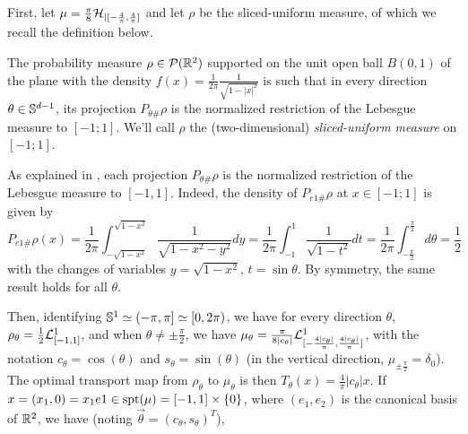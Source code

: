 First, let $\mu = \frac{\pi}{8} \mathcal{H}_{|[-\frac{4}{\pi},\frac{4}{\pi}]}$ and let $\rho$ be the sliced-uniform measure, of which we recall the definition below.

\begin{definition} \label{def:sliced_uniform}   
    The probability measure $\rho \in \mathcal{P}(\mathbb R^2)$ supported on the unit open ball $B(0,1)$ of the plane with the density $f(x) = \frac{1}{2\pi} \frac{1}{\sqrt{1 - |x|^2}}$ is such that in every direction $\theta \in \mathbb{S}^{d-1}$, its projection $P_{\theta\#}\rho$ is the normalized restriction of the Lebesgue measure to $[-1;1]$. We'll call $\rho$ the (two-dimensional) \textit{sliced-uniform measure} on $[-1;1]$.
\end{definition}

As explained in , each projection $P_{\theta\#}\rho$ is the normalized restriction of the Lebesgue measure to $[-1,1]$. Indeed, the density of $P_{e1\#}\rho$ at $x \in [-1;1]$ is given by
\begin{equation}
     P_{e1\#}\rho(x) = \frac{1}{2\pi} \int_{-\sqrt{1-x^2}}^{\sqrt{1-x^2}} \frac{1}{\sqrt{1 - x^2 - y^2}} dy
    = \frac{1}{2\pi} \int_{-1}^1 \frac{1}{\sqrt{1-t^2}} dt = \frac{1}{2\pi} \int_{-\frac{\pi}{2}}^{\frac{\pi}{2}} d\theta = \frac{1}{2}
\end{equation}
with the changes of variables $y = \sqrt{1-x^2}$, $t = \sin \theta$. By symmetry, the same result holds for all $\theta$. 

Then, identifying $\mathbb S^1 \simeq (-\pi,\pi] \simeq [0,2\pi)$, we have for every direction $\theta$, $\rho_\theta = \frac{1}{2} \mathcal L^1_{[-1,1]}$, and when $\theta \neq \pm \frac{\pi}{2}$, we have $\mu_\theta = \frac{\pi}{8|c_\theta|} \mathcal L^1_{[-\frac{4|c_\theta|}{\pi}, \frac{4|c_\theta|}{\pi}]}$, with the notation $c_\theta = \cos(\theta)$ and $s_\theta = \sin(\theta)$ (in the vertical direction, $\mu_{\pm\frac{\pi}{2}} = \delta_0$). The optimal transport map from $\rho_\theta$ to $\mu_\theta$ is then $T_\theta(x) = \frac{4}{\pi}|c_\theta|x$. If $x = (x_1,0) = x_1 e1 \in \mathrm{spt}(\mu) = [-1,1] \times \{0\}$, where $(e_1,e_2)$ is the canonical basis of $\mathbb R^2$, we have (noting $\vec{\theta} = (c_\theta, s_\theta)^T$),


